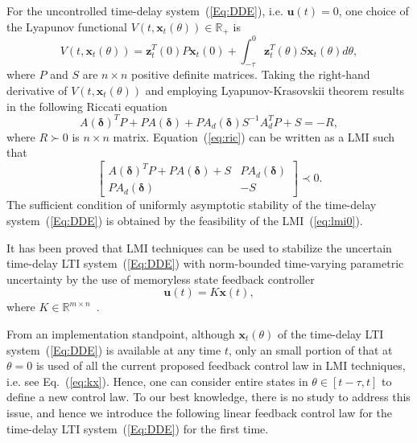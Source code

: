 \documentclass[journal]{IEEEtran}
\begin{document}
For the uncontrolled time-delay system~(\ref{Eq:DDE}), i.e. $ \mathbf u(t)=0 $, one choice of the Lyapunov functional $ V(t,\mathbf x_t(\theta))\in \mathbb R_+$ is
\begin{equation}\label{key}
	V(t,\mathbf x_t(\theta))= \mathbf z^T_t(0) P \mathbf x_t(0) +\int_{-\tau}^{0} \mathbf z^T_t(\theta)S \mathbf x_t(\theta) d \theta,
\end{equation}
where $ P $ and $ S $ are $ n \times n $ positive definite matrices.
Taking the right-hand derivative of $ V(t,\mathbf x_t(\theta)) $ and employing Lyapunov-Krasovskii theorem results in the following Riccati equation
\begin{equation}\label{eq:ric}
	A(\boldsymbol{\delta})^TP+PA(\boldsymbol{\delta})+PA_d(\boldsymbol{\delta})S^{-1}A_d^TP+S=-R,
\end{equation}
where $ R\succ 0$ is $ n \times n $ matrix. Equation~(\ref{eq:ric}) can be written as a LMI such that
\begin{equation}\label{eq:lmi0}
	\begin{bmatrix}
		A(\boldsymbol{\delta})^TP+PA(\boldsymbol{\delta})+S & PA_d(\boldsymbol{\delta}) \\
		PA_d(\boldsymbol{\delta})                           & -S
	\end{bmatrix} \prec 0.
\end{equation}
The sufficient condition of uniformly asymptotic stability of the time-delay system~(\ref{Eq:DDE}) is obtained by the feasibility of the LMI~(\ref{eq:lmi0}).



It has been proved that LMI techniques can be used to stabilize the uncertain time-delay LTI system~(\ref{Eq:DDE}) with norm-bounded time-varying parametric uncertainty by the use of memoryless state feedback controller
\begin{equation}\label{eq:kx}
	\mathbf u(t) = K\mathbf x(t) ,
\end{equation}
where $ K\in \mathbb R^{m \times n} $~\cite{Yu1999lmi}.

From an implementation standpoint, although $ \mathbf x_t(\theta) $ of the time-delay LTI system~(\ref{Eq:DDE}) is available at any time $ t $, only an small portion of that at $ \theta=0 $ is used of all the current proposed feedback control law in LMI techniques, i.e. see Eq.~(\ref{eq:kx}). Hence, one can consider entire states in $ \theta \in [t-\tau,t] $ to define a new control law. To our best knowledge, there is no study to address this issue, and hence we introduce the following linear feedback control law for the time-delay LTI system~(\ref{Eq:DDE}) for the first time.
\end{document}
